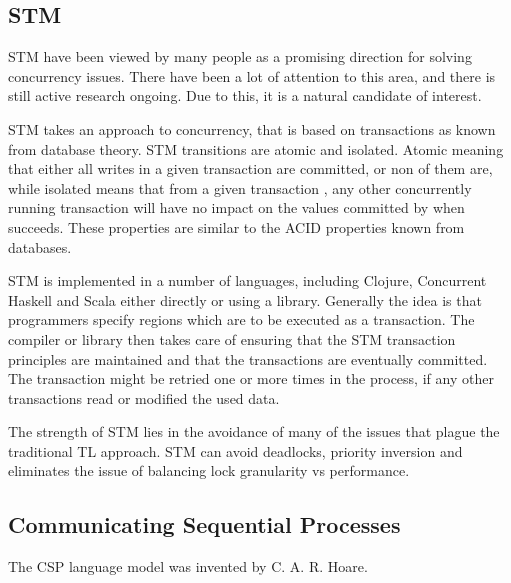 \subsection{\acl{STM}}
\ac{STM} have been viewed by many people as a promising direction for solving concurrency issues\cite{sutter2005software}. There have been a lot of attention to this area, and there is still active research ongoing. Due to this, it is a natural candidate of interest.

\ac{STM} takes an approach to concurrency, that is based on transactions as known from database theory\cite[p. 1]{shavit1997software}. \ac{STM} transitions are atomic and isolated. Atomic meaning that either all writes in a given transaction are committed, or non of them are, while isolated means that from a given transaction , any other concurrently running transaction will have no impact on the values committed by  when  succeeds\cite[p. 102]{sevenModels}. These properties are similar to the \ac{ACID} properties known from databases\cite[p. 754]{elmasri2011fundamentals}.

\ac{STM} is implemented in a number of languages, including Clojure\cite[p. 101]{sevenModels}, Concurrent Haskell\cite{harris2005composable} and Scala\cite{goodman2011muts} either directly or using a library. Generally the idea is that programmers specify regions which are to be executed as a transaction. The compiler or library then takes care of ensuring that the \ac{STM} transaction principles are maintained and that the transactions are eventually committed\cite[p. 1]{saha2006mcrt}. The transaction might be retried one or more times in the process, if any other transactions read or modified the used data.

The strength of \ac{STM} lies in the avoidance of many of the issues that plague the traditional \ac{TL} approach. \ac{STM} can avoid deadlocks, priority inversion and eliminates the issue of balancing lock granularity vs performance\cite[p. 1]{harris2005composable}.

\subsection{Communicating Sequential Processes}
The \ac{CSP} language model was invented by C. A. R. Hoare\cite{abdallah2005communicating}. 


\worksheetend
